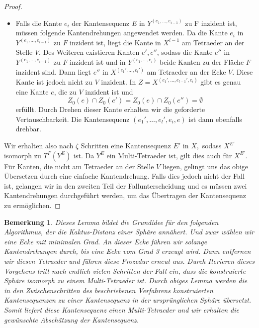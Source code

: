 \documentclass[12pt,titlepage,twoside,cleardoublepage]{article}
\theoremstyle{nummermitklammern}
\newtheorem{bemerkung}[temp]{Bemerkung}
\newtheorem{bemerkung}[zahl]{Bemerkung}
\numberwithin{equation}{section}
\begin{document}
\begin{proof}
\begin{itemize}
\item Falls die Kante $e_i$ der Kantensequenz $E$ in $Y^{(e_1,\ldots,e_{i-1})}$ zu F inzident ist, müssen folgende Kantendrehungen angewendet werden. Da die Kante $e_i$ in $Y^{(e_1,\ldots,e_{i-1})}$ zu $F$ inzident ist, liegt die Kante in $X^{i-1}$ am Tetraeder an der Stelle $V.$
Des Weiteren existieren Kanten $e',e''$, sodass die Kante $e''$ in $Y^{(e_1,\ldots,e_{i-1})}$ zu $F$ inzident ist und in $Y^{(e_1,\ldots,e_{i})}$ beide Kanten zu der Fläche $F$ inzident sind.
Dann liegt $e''$ in $X^{(e_1',\ldots,e_l')}$ am Tetraeder an der Ecke $V.$ Diese Kante ist jedoch nicht zu $V$ inzident.  
In $Z=X^{(e_1',\ldots,e_{l-1}',e_i)}$ gibt es genau eine Kante $e$, die zu $V$ inzident ist und 
 \[
Z_0(e)\cap Z_0(e')=Z_0(e)\cap Z_0(e'')=\emptyset
\]
erfüllt. Durch Drehen dieser Kante erhalten wir die geforderte Vertauschbarkeit. Die Kantensequenz $(e_1',\ldots,e_l',e_i,e)$ ist dann ebenfalls drehbar.
\end{itemize}
Wir erhalten also nach $\zeta$ Schritten eine Kantensequenz $E'$ in $X,$ sodass $X^{E'}$ isomorph zu $T^F(Y^{E})$ ist. Da $Y^{E}$ ein Multi-Tetraeder ist, gilt dies auch für $X^{E'}.$ Für Kanten, die nicht am Tetraeder an der Stelle $V$ liegen, gelingt uns das obige Übersetzen durch eine einfache Kantendrehung. Falls dies jedoch nicht der Fall ist, gelangen wir in den zweiten Teil der Fallunterscheidung und es müssen zwei Kantendrehungen durchgeführt werden, um das Übertragen der Kantensequenz zu ermöglichen.
\end{proof}
\begin{bemerkung}\label{alg}
Dieses Lemma bildet die Grundidee für den folgenden Algorithmus, der die Kaktus-Distanz einer Sphäre annähert. Und zwar wählen wir eine Ecke mit minimalen Grad. An dieser Ecke führen wir solange Kantendrehungen durch, bis eine Ecke vom Grad 3 erzeugt wird. Dann entfernen wir diesen Tetraeder und führen diese Prozedur erneut aus. Durch Iterieren dieses Vorgehens tritt nach endlich vielen Schritten der Fall ein, dass die konstruierte Sphäre isomorph zu einem Multi-Tetraeder ist. Durch obiges Lemma werden die in den Zwischenschritten des beschriebenen Verfahrens konstruierten Kantensequenzen zu einer Kantensequenz in der ursprünglichen Sphäre übersetzt. Somit liefert diese Kantensequenz einen Multi-Tetraeder und wir erhalten die gewünschte Abschätzung der Kantensequenz.
\end{bemerkung}
\end{document}
